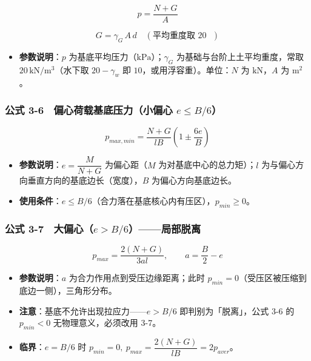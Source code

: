 \documentclass[
]{article}
\providecommand{\tightlist}{%
  \setlength{\itemsep}{0pt}\setlength{\parskip}{0pt}}
\begin{document}
\[p=\frac{N+G}{A}\]

\[G=\gamma_{G}\,A\,d\quad(\text{平均重度取 }20\text{ })\]

\begin{itemize}
\tightlist
\item
  \textbf{参数说明}：\(p\)
  为基底平均压力（\(\mathrm{kPa}\)）；\(\gamma_G\)
  为基础与台阶上土平均重度，常取 \(20\,\mathrm{kN/m^3}\)（水下取
  \(20-\gamma_w\) 即 \(10\)，或用浮容重）。单位：\(N\) 为
  \(\mathrm{kN}\)，\(A\) 为 \(\mathrm{m^2}\)。
\end{itemize}

\subsubsection{\texorpdfstring{公式 3-6　偏心荷载基底压力（小偏心
\(e\le B/6\)）}{公式 3-6　偏心荷载基底压力（小偏心 e\textbackslash le B/6）}}\label{ux516cux5f0f-3-6-ux504fux5fc3ux8377ux8f7dux57faux5e95ux538bux529bux5c0fux504fux5fc3-ele-b6}

\[\boxed{p_{max,min}=\frac{N+G}{lB}\left(1\pm\frac{6e}{B}\right)}\]

\begin{itemize}
\tightlist
\item
  \textbf{参数说明}：\(e=\dfrac{M}{N+G}\) 为偏心距（\(M\)
  为对基底中心的总力矩）；\(l\)
  为与偏心方向垂直方向的基底边长（宽度），\(B\) 为偏心方向基底边长。
\item
  \textbf{使用条件}：\(e\le B/6\)（合力落在基底核心内有压区），\(p_{min}\ge0\)。
\end{itemize}

\subsubsection{\texorpdfstring{公式
3-7　大偏心（\(e>B/6\)）------局部脱离}{公式 3-7　大偏心（e\textgreater B/6）------局部脱离}}\label{ux516cux5f0f-3-7-ux5927ux504fux5fc3eb6ux5c40ux90e8ux8131ux79bb}

\[p_{max}=\frac{2(N+G)}{3al},\qquad a=\frac{B}{2}-e\]

\begin{itemize}
\tightlist
\item
  \textbf{参数说明}：\(a\) 为合力作用点到受压边缘距离；此时
  \(p_{min}=0\)（受压区被压缩到底边一侧），三角形分布。
\item
  \textbf{注意}：基底不允许出现拉应力------\(e>B/6\)
  即判别为「脱离」，公式 3-6 的 \(p_{min}<0\) 无物理意义，必须改用 3-7。
\item
  \textbf{临界}：\(e=B/6\) 时
  \(p_{min}=0,\ p_{max}=\dfrac{2(N+G)}{lB}=2p_{aver}\)。
\end{itemize}
\end{document}
